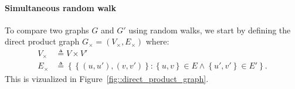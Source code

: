                 \paragraph{Simultaneous random walk}
                    To compare two graphs \(G\) and \(G'\) using random walks, we start by defining the direct product graph $G_{\times} = \left(V_{\times}, E_{\times}\right)$ where:
                    \begin{align}
                        \label{eq::direct_product_graph}
                        V_{\times} &\triangleq V \times V'\\
                        E_{\times} &\triangleq \left\{\left\{(u, u'), (v, v')\right\}: \left\{u,v\right\} \in E \wedge \left\{u',v'\right\} \in E'\right\}.
                    \end{align}
                    This is vizualized in Figure~\ref{fig::direct_product_graph}.

